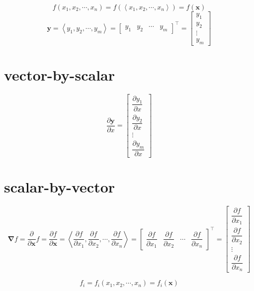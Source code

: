 \documentclass[
]{book}
\theoremstyle{definition}
\theoremstyle{definition}
\theoremstyle{definition}
\theoremstyle{definition}
\theoremstyle{remark}
\begin{document}
\[
f\left(x_{1},x_{2},\cdots,x_{n}\right)=f\left(\left\langle x_{1},x_{2},\cdots,x_{n}\right\rangle \right)=f\left(\boldsymbol{x}\right)
\]
\[
\boldsymbol{y}=\left\langle y_{1},y_{2},\cdots,y_{m}\right\rangle =\begin{bmatrix}y_{1} & y_{2} & \cdots & y_{m}\end{bmatrix}^{\intercal}=\begin{bmatrix}y_{1}\\
y_{2}\\
\vdots\\
y_{m}
\end{bmatrix}
\]

\section{vector-by-scalar}\label{vector-by-scalar}

\[
\dfrac{\partial\boldsymbol{y}}{\partial x}=\left[\begin{array}{c}
\dfrac{\partial y_{1}}{\partial x}\\
\dfrac{\partial y_{2}}{\partial x}\\
\vdots\\
\dfrac{\partial y_{m}}{\partial x}
\end{array}\right]
\]

\section{scalar-by-vector}\label{scalar-by-vector}

\[
\boldsymbol{\nabla}f=\dfrac{\partial}{\partial\boldsymbol{x}}f=\dfrac{\partial f}{\partial\boldsymbol{x}}=\left\langle \dfrac{\partial f}{\partial x_{1}},\dfrac{\partial f}{\partial x_{2}},\cdots,\dfrac{\partial f}{\partial x_{n}}\right\rangle =\begin{bmatrix}\dfrac{\partial f}{\partial x_{1}} & \dfrac{\partial f}{\partial x_{2}} & \cdots & \dfrac{\partial f}{\partial x_{n}}\end{bmatrix}^{\intercal}=\begin{bmatrix}\dfrac{\partial f}{\partial x_{1}}\\
\dfrac{\partial f}{\partial x_{2}}\\
\vdots\\
\dfrac{\partial f}{\partial x_{n}}
\end{bmatrix}
\]

\[
f_i = f_i\left(x_{1},x_{2},\cdots,x_{n}\right)=f_i\left(\boldsymbol{x}\right)
\]
\end{document}
